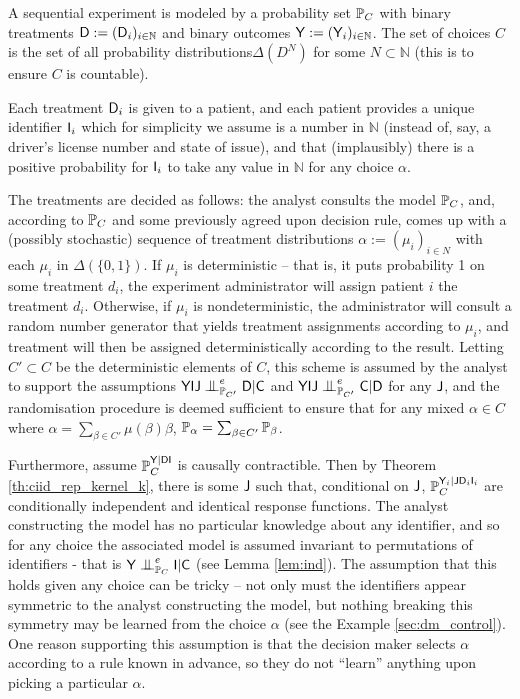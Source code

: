 \begin{example}\label{ex:randomised_experiment}
A sequential experiment is modeled by a probability set $\mathbb{P}_C$ with binary treatments $\mathsf{D}:=(\mathsf{D}_i)_{i\in \mathbb{N}}$ and binary outcomes $\mathsf{Y}:=(\mathsf{Y}_i)_{i\in\mathbb{N}}$. The set of choices $C$ is the set of all probability distributions$\Delta(D^N)$ for some $N\subset\mathbb{N}$ (this is to ensure $C$ is countable).

Each treatment $\mathsf{D}_i$ is given to a patient, and each patient provides a unique identifier $\mathsf{I}_i$ which for simplicity we assume is a number in $\mathbb{N}$ (instead of, say, a driver's license number and state of issue), and that (implausibly) there is a positive probability for $\mathsf{I}_i$ to take any value in $\mathbb{N}$ for any choice $\alpha$.

The treatments are decided as follows: the analyst consults the model $\mathbb{P}_C$, and, according to $\mathbb{P}_C$ and some previously agreed upon decision rule, comes up with a (possibly stochastic) sequence  of treatment distributions $\alpha:=(\mu_i)_{i\in N}$ with each $\mu_i$ in $\Delta(\{0,1\})$. If $\mu_i$ is deterministic -- that is, it puts probability 1 on some treatment $d_i$, the experiment administrator will assign patient $i$ the treatment $d_i$. Otherwise, if $\mu_i$ is nondeterministic, the administrator will consult a random number generator that yields treatment assignments according to $\mu_i$, and treatment will then be assigned deterministically according to the result. Letting $C'\subset C$ be the deterministic elements of $C$, this scheme is assumed by the analyst to support the assumptions $\RV{YIJ}\CI^e_{\prob{P}_{C'}} \RV{D}|\RV{C}$ and $\RV{YIJ}\CI^e_{\prob{P}_{C'}} \RV{C}|\RV{D}$ for any $\mathsf{J}$, and the randomisation procedure is deemed sufficient to ensure that for any mixed $\alpha\in C$ where $\alpha = \sum_{\beta\in C'} \mu(\beta) \beta$, $\mathbb{P}_\alpha = \sum_{\beta\in C'} \mathbb{P}_\beta$.

Furthermore, assume $\mathbb{P}_C^{\mathsf{Y}|\mathsf{DI}}$ is causally contractible. Then by Theorem \ref{th:ciid_rep_kernel_k}, there is some $\mathsf{J}$ such that, conditional on $\mathsf{J}$, $\mathbb{P}_C^{\mathsf{Y}_i|\mathsf{J}\mathsf{D}_i\mathsf{I}_i}$ are conditionally independent and identical response functions. The analyst constructing the model has no particular knowledge about any identifier, and so for any choice the associated model is assumed invariant to permutations of identifiers - that is $\RV{Y}\CI^e_{\prob{P}_C} \RV{I}|\RV{C}$ (see Lemma \ref{lem:ind}). The assumption that this holds given any choice can be tricky -- not only must the identifiers appear symmetric to the analyst constructing the model, but nothing breaking this symmetry may be learned from the choice $\alpha$ (see the Example \ref{sec:dm_control}). One reason supporting this assumption is that the decision maker selects $\alpha$ according to a rule known in advance, so they do not ``learn'' anything upon picking a particular $\alpha$.


\end{example}
